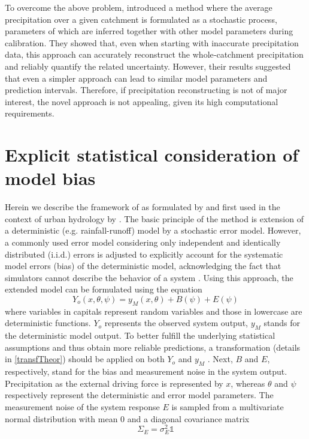 \documentclass{ctuthesis}\usepackage[]{graphicx}\usepackage[]{color}
\begin{document}
To overcome the above problem, \cite{delgiudiceDescribingCatchmentaveragedPrecipitation2016} introduced a method where the average precipitation over a given catchment is formulated as a stochastic process, parameters of which are inferred together with other model parameters during calibration. They showed that, even when starting with inaccurate precipitation data, this approach can accurately reconstruct the whole‐catchment precipitation and reliably quantify the related uncertainty. However, their results suggested that even a simpler approach \citep[e.g.][]{giudice2013improving} can lead to similar model parameters and prediction intervals. Therefore, if precipitation reconstructing is not of major interest, the novel approach is not appealing, given its high computational requirements.



\section{Explicit statistical consideration of model bias} \label{delGiudTheor}

Herein we describe the framework of \cite{kennedy2001bayesian} as formulated by \cite{reichert2012linking} and first used in the context of urban hydrology by \cite{giudice2013improving}. The basic principle of the method is extension of a deterministic (e.g. rainfall-runoff) model by a stochastic error model. However, a commonly used error model considering only independent and identically distributed (i.i.d.) errors is adjusted to explicitly account for the systematic model errors (bias) of the deterministic model, acknowledging the fact that simulators cannot describe the  behavior of a system \citep{giudice2013improving}. Using this approach, the extended model can be formulated using the equation
\begin{equation} \label{eq:ext_model}
Y_o (x,\theta, \psi) = y_M (x, \theta) + B (\psi) + E (\psi)
\end{equation}
where variables in capitals represent random variables and those in lowercase are deterministic functions. $Y_o$ represents the observed system output, $y_M$ stands for the deterministic model output. To better fulfill the underlying statistical assumptions and thus obtain more reliable predictions, a transformation (details in \ref{transfTheor}) should be applied on both $Y_o$ and $y_M$ \citep{giudice2013improving}. Next, $B$ and $E$, respectively, stand for the bias and  measurement noise in the system output. Precipitation as the external driving force is represented by $x$, whereas $\theta$ and $\psi$ respectively represent the deterministic and error model parameters. The measurement noise of the system response $E$ is sampled from a multivariate normal distribution with mean 0 and a diagonal covariance matrix
\begin{equation}
\Sigma_E= \sigma_E^2 \mathds{1}
\end{equation}
\end{document}
